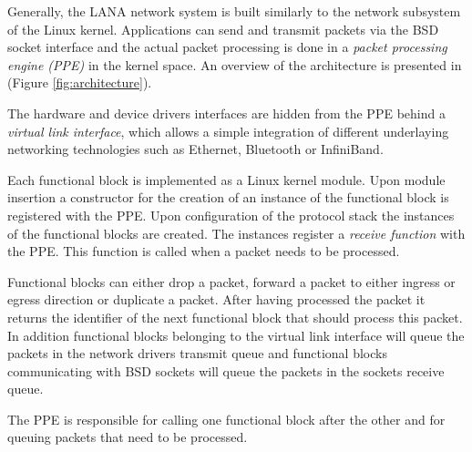\documentclass{sig-alternate}
\newcommand{\daniel}[1]{\textcolor{red}{\emph{DB: #1}}}
\begin{document}
Generally, the LANA network system is built similarly to the network subsystem of the Linux kernel.
Applications can send and transmit packets via the BSD socket interface and the actual packet processing is done in a \textit{packet processing engine (PPE)} in the kernel space. An overview of the architecture is presented in (Figure \ref{fig:architecture}).


The hardware and device drivers interfaces are hidden from the PPE behind a \textit{virtual link interface}, which allows a simple integration of different underlaying networking technologies such as Ethernet, Bluetooth or InfiniBand.

Each functional block is implemented as a Linux kernel module. 
Upon module insertion a constructor for the creation of an instance of the functional block is registered with the PPE. Upon configuration of the protocol stack the instances of the functional blocks are created. The instances register a \textit{receive function} with the PPE. This function is called when a packet needs to be processed.

Functional blocks can either drop a packet, forward a packet to either ingress or egress direction or duplicate a packet. After having processed the packet it returns the identifier of the next functional block that should process this packet. In addition functional blocks belonging to the virtual link interface will queue the packets in the network drivers transmit queue and functional blocks communicating with BSD sockets will queue the packets in the sockets receive queue.

The PPE is responsible for calling one functional block after the other and for queuing packets that need to be processed.

\end{document}
